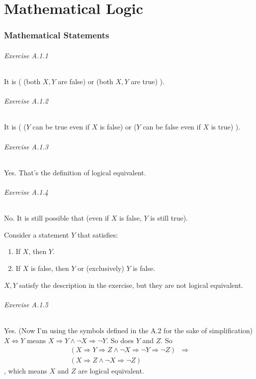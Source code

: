 \part{Mathematical Logic}

\section{Mathematical Statements}

\paragraph{Exercise A.1.1}
\label{exercisea.1.1}
It is ( (both $X, Y$ are false) or (both $X, Y$ are true) ).

\paragraph{Exercise A.1.2}
\label{exercisea.1.2}
It is ( ($Y$ can be true even if $X$ is false) or ($Y$ can be false even if $X$ is true) ).

\paragraph{Exercise A.1.3}
\label{exercisea.1.3}
Yes. That's the definition of logical equivalent.

\paragraph{Exercise A.1.4}
\label{exercisea.1.4}
No. It is still possible that (even if $X$ is false, $Y$ is still true).

Consider a statement $Y$ that satisfies:
\begin{enumerate}
\item If $X$, then $Y$.
\item If $X$ is false, then $Y$ or (exclusively) $Y$ is false.
\end{enumerate}

$X,Y$ satisfy the description in the exercise, but they are not logical equivalent.

\paragraph{Exercise A.1.5}
\label{exercisea.1.5}
Yes. (Now I'm using the symbols defined in the A.2 for the sake of simplification)
$X \Longleftrightarrow Y$ means $X \Longrightarrow Y \wedge \neg X \Longrightarrow \neg Y$. So does $Y$ and 
$Z$. So 
\begin{align*}
(X \Longrightarrow Y \Longrightarrow Z \wedge \neg X \Longrightarrow \neg Y \Longrightarrow \neg Z)
&\Longrightarrow \\
(X \Longrightarrow Z \wedge \neg X \Longrightarrow \neg Z)
\end{align*}
, which means $X$ and $Z$ are logical equivalent.

